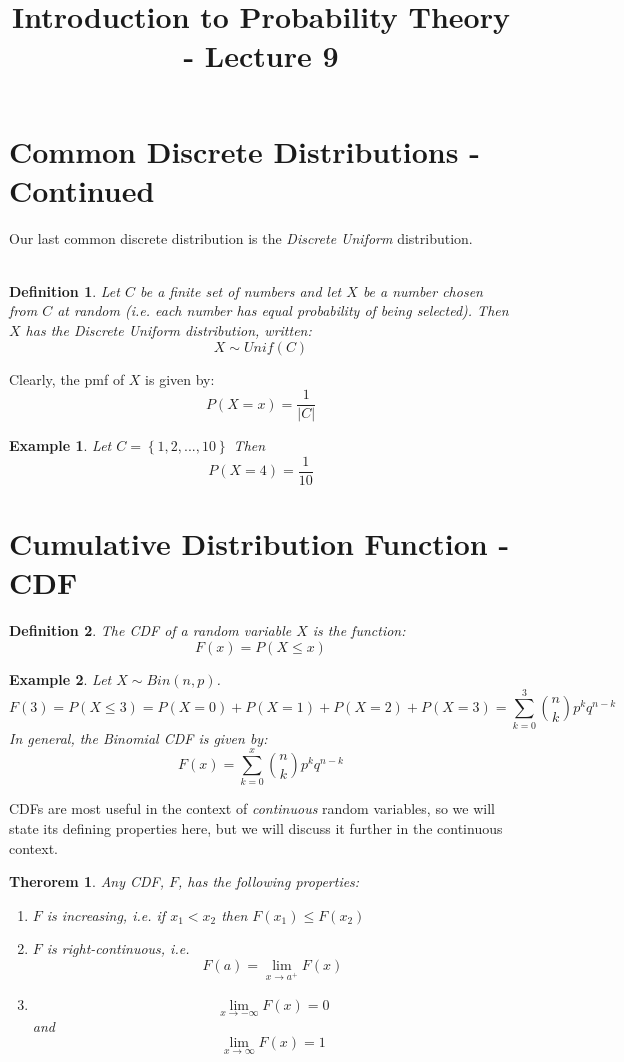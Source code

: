 \documentclass[12pt]{article} %
\title{Introduction to Probability Theory - Lecture 9}
\newtheorem{defn}{Definition}
\newtheorem{example}{Example}
\newtheorem{thm}{Therorem}
\begin{document}
\maketitle
\section{Common Discrete Distributions - Continued}
Our last common discrete distribution is the \emph{Discrete Uniform} distribution.\\\\
\begin{defn}
Let $C$ be a finite set of numbers and let $X$ be a number chosen from $C$ at random (i.e. each number has equal probability of being selected). Then $X$ has the \emph{Discrete Uniform} distribution, written:
$$X\sim Unif(C)$$
\end{defn}
Clearly, the pmf of $X$ is given by:
$$P(X=x) = \frac1{|C|}$$
\begin{example}
Let $C =\left\{1,2,...,10\right\}$ Then
$$P(X=4) = \frac1{10}$$
\end{example}
\section{Cumulative Distribution Function - CDF}
\begin{defn}
The CDF of a random variable $X$ is the function:
$$F(x) = P(X\leq x)$$
\end{defn}
\begin{example}
Let $X\sim Bin(n,p)$.
$$F(3) = P(X\leq 3) = P(X=0)+P(X=1)+P(X=2)+P(X=3) = \sum_{k=0}^3{n\choose{k}}p^kq^{n-k}$$
In general, the Binomial CDF is given by:
$$F(x) = \sum_{k=0}^x {n\choose{k}}p^kq^{n-k}$$
\end{example}
CDFs are most useful in the context of \emph{continuous} random variables, so we will state its defining properties here, but we will discuss it further in the continuous context.
\begin{thm}
Any CDF, $F$, has the following properties:
\begin{enumerate}
\item $F$ is increasing, i.e. if $x_1<x_2$ then $F(x_1)\leq F(x_2)$
\item $F$ is right-continuous, i.e.
$$F(a) = \lim_{x\rightarrow a^+} F(x)$$
\item 
$$\lim_{x\rightarrow -\infty} F(x) = 0$$
and
$$\lim_{x\rightarrow\infty} F(x) = 1$$
\end{enumerate}
\end{thm}
\end{document}

